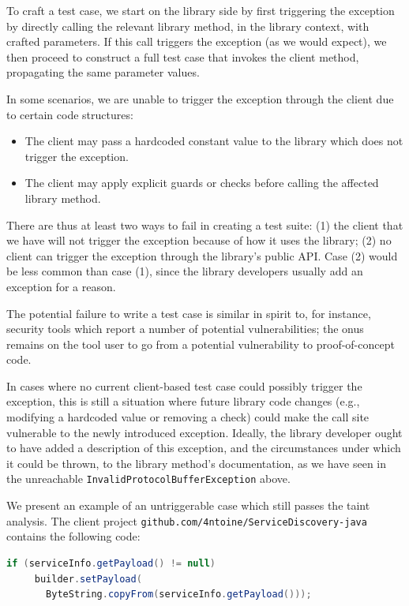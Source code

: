 To craft a test case, we start on the library side by first triggering the exception by directly calling the relevant library method, in the library context, with crafted parameters. If this call triggers the exception (as we would expect), we then proceed to construct a full test case that invokes the client method, propagating the same parameter values.

In some scenarios, we are unable to trigger the exception through the client due to certain code structures:
\begin{itemize}
  \item The client may pass a hardcoded constant value to the library which does not trigger the exception.
  \item The client may apply explicit guards or checks before calling the affected library method.
\end{itemize}
There are thus at least two ways to fail in creating a test suite: (1) the client that we have will not trigger the exception because of how it uses the library; (2) no client can trigger the exception through the library's public API. Case (2) would be less common than case (1), since the library developers usually add an exception for a reason.

The potential failure to write a test case is similar in spirit to, for instance, security tools which report a number of potential vulnerabilities; the onus remains on the tool user to go from a potential vulnerability to proof-of-concept code.

In cases where no current client-based test case could possibly trigger the exception, this is still a situation where future library code changes (e.g., modifying a hardcoded value or removing a check) could make the call site vulnerable to the newly introduced exception. Ideally, the library developer ought to have added a description of this exception, and the circumstances under which it could be thrown, to the library method's documentation, as we have seen in the unreachable \texttt{InvalidProtocolBufferException} above.

We present an example of an untriggerable case which still passes the taint analysis. The client project \texttt{github.com/4ntoine/ServiceDiscovery-java} contains the following code:

\begin{lstlisting}[language=Java]
    if (serviceInfo.getPayload() != null)
     builder.setPayload(
       ByteString.copyFrom(serviceInfo.getPayload()));
\end{lstlisting}

